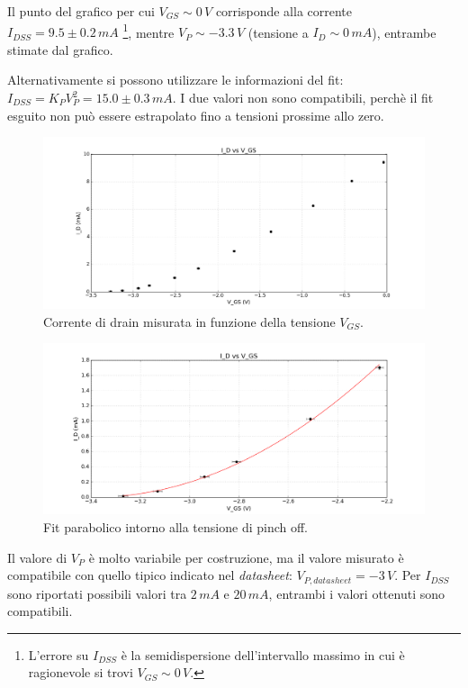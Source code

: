 \documentclass[10pt,a4paper]{article}
\begin{document}
Il punto del grafico per cui $V_{GS} \sim 0\,V$ corrisponde alla corrente $I_{DSS} = 9.5 \pm 0.2\, mA$ \footnote{L'errore su $I_{DSS}$ è la semidispersione dell'intervallo massimo in cui è ragionevole si trovi $V_{GS} \sim 0\,V$.}, mentre $V_P \sim -3.3\,V$ (tensione a $I_D \sim 0 \, mA$), entrambe stimate dal grafico.

Alternativamente si possono utilizzare le informazioni del fit: $I_{DSS} = K_P V_{P}^2 = 15.0 \pm 0.3 \, mA$. I due valori non sono compatibili, perchè il fit esguito non può essere estrapolato fino a tensioni prossime allo zero.


\begin{figure}
\centering
\includegraphics[scale=0.5]{parabolaTutti.png}
\caption{Corrente di drain misurata in funzione della tensione $V_{GS}$.\label{tuttiIdati}}
\end{figure}

\begin{figure}
\centering
\includegraphics[scale=0.5]{parabolaFit.png}
\caption{Fit parabolico intorno alla tensione di pinch off.\label{correnteIdVgs}}
\end{figure}

Il valore di $V_P$ è molto variabile per costruzione, ma il valore misurato è compatibile con quello tipico indicato nel \emph{datasheet}: $V_{P, datasheet} = -3 \, V$. Per $I_{DSS}$ sono riportati possibili valori tra $2 \, mA$ e $20 \, mA$, entrambi i valori ottenuti sono compatibili.
\end{document}
